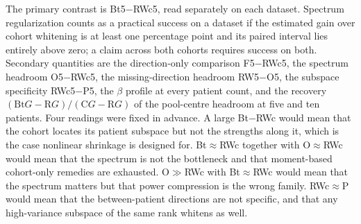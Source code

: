 \documentclass[11pt]{article}
\begin{document}
The primary contrast is Bt5$-$RWc5, read separately on each dataset. Spectrum regularization counts as a practical success on a dataset if the estimated gain over cohort whitening is at least one percentage point and its paired interval lies entirely above zero; a claim across both cohorts requires success on both. Secondary quantities are the direction-only comparison F5$-$RWc5, the spectrum headroom O5$-$RWc5, the missing-direction headroom RW5$-$O5, the subspace specificity RWc5$-$P5, the $\beta$ profile at every patient count, and the recovery $(\mathrm{Bt}G-\mathrm RG)/(\mathrm CG-\mathrm RG)$ of the pool-centre headroom at five and ten patients. Four readings were fixed in advance. A large Bt$-$RWc would mean that the cohort locates its patient subspace but not the strengths along it, which is the case nonlinear shrinkage is designed for. Bt$\approx$RWc together with O$\approx$RWc would mean that the spectrum is not the bottleneck and that moment-based cohort-only remedies are exhausted. O$\gg$RWc with Bt$\approx$RWc would mean that the spectrum matters but that power compression is the wrong family. RWc$\approx$P would mean that the between-patient directions are not specific, and that any high-variance subspace of the same rank whitens as well.





\end{document}
